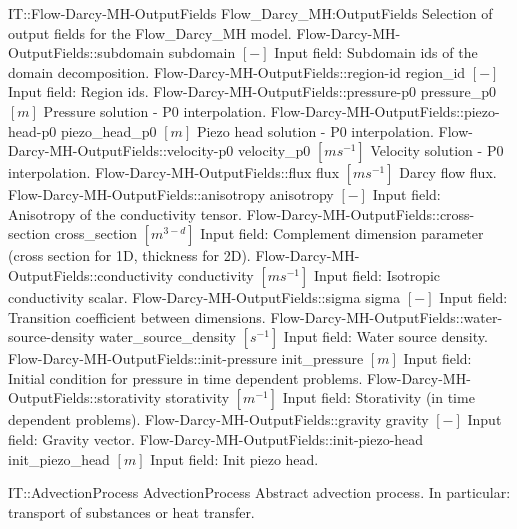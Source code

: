 \begin{SelectionType}
	{IT::Flow-Darcy-MH-OutputFields}
	{Flow{\_}Darcy{\_}MH:OutputFields}
	{{{Selection of output fields for the Flow{\_}Darcy{\_}MH model.}%
}}
		\SelectionItem
			{Flow-Darcy-MH-OutputFields::subdomain}
			{subdomain}
			{{{}{$[-]$}{ Input field: Subdomain ids of the domain decomposition.}%
}}
		\SelectionItem
			{Flow-Darcy-MH-OutputFields::region-id}
			{region{\_}id}
			{{{}{$[-]$}{ Input field: Region ids.}%
}}
		\SelectionItem
			{Flow-Darcy-MH-OutputFields::pressure-p0}
			{pressure{\_}p0}
			{{{}{$[m]$}{ Pressure solution - P0 interpolation.}%
}}
		\SelectionItem
			{Flow-Darcy-MH-OutputFields::piezo-head-p0}
			{piezo{\_}head{\_}p0}
			{{{}{$[m]$}{ Piezo head solution - P0 interpolation.}%
}}
		\SelectionItem
			{Flow-Darcy-MH-OutputFields::velocity-p0}
			{velocity{\_}p0}
			{{{}{$[ms^{-1}]$}{ Velocity solution - P0 interpolation.}%
}}
		\SelectionItem
			{Flow-Darcy-MH-OutputFields::flux}
			{flux}
			{{{}{$[ms^{-1}]$}{ Darcy flow flux.}%
}}
		\SelectionItem
			{Flow-Darcy-MH-OutputFields::anisotropy}
			{anisotropy}
			{{{}{$[-]$}{ Input field: Anisotropy of the conductivity tensor.}%
}}
		\SelectionItem
			{Flow-Darcy-MH-OutputFields::cross-section}
			{cross{\_}section}
			{{{}{$[m^{3-d}]$}{ Input field: Complement dimension parameter (cross section for 1D, thickness for 2D).}%
}}
		\SelectionItem
			{Flow-Darcy-MH-OutputFields::conductivity}
			{conductivity}
			{{{}{$[ms^{-1}]$}{ Input field: Isotropic conductivity scalar.}%
}}
		\SelectionItem
			{Flow-Darcy-MH-OutputFields::sigma}
			{sigma}
			{{{}{$[-]$}{ Input field: Transition coefficient between dimensions.}%
}}
		\SelectionItem
			{Flow-Darcy-MH-OutputFields::water-source-density}
			{water{\_}source{\_}density}
			{{{}{$[s^{-1}]$}{ Input field: Water source density.}%
}}
		\SelectionItem
			{Flow-Darcy-MH-OutputFields::init-pressure}
			{init{\_}pressure}
			{{{}{$[m]$}{ Input field: Initial condition for pressure in time dependent problems.}%
}}
		\SelectionItem
			{Flow-Darcy-MH-OutputFields::storativity}
			{storativity}
			{{{}{$[m^{-1}]$}{ Input field: Storativity (in time dependent problems).}%
}}
		\SelectionItem
			{Flow-Darcy-MH-OutputFields::gravity}
			{gravity}
			{{{}{$[-]$}{ Input field: Gravity vector.}%
}}
		\SelectionItem
			{Flow-Darcy-MH-OutputFields::init-piezo-head}
			{init{\_}piezo{\_}head}
			{{{}{$[m]$}{ Input field: Init piezo head.}%
}}
\end{SelectionType}
\begin{AbstractType}
	{IT::AdvectionProcess}
	{AdvectionProcess}
	{}
	{{{Abstract advection process.
In particular: transport of substances or heat transfer.}%
}}
\end{AbstractType}

